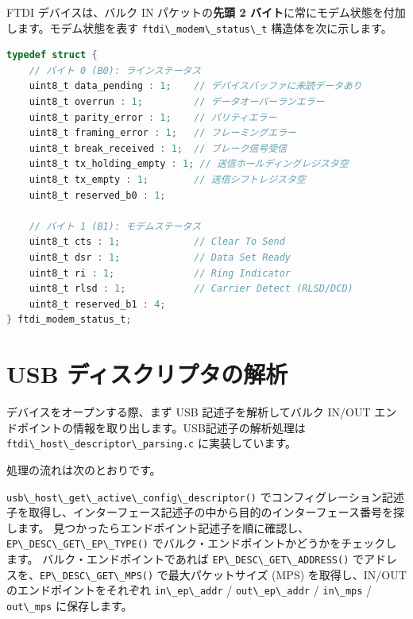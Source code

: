 \documentclass[10pt,twoside,openany,a4j]{ltjsbook}
\newcommand{\passthrough}[1]{#1}
\begin{document}
FTDI デバイスは、バルク IN パケットの\textbf{先頭 2
バイト}に常にモデム状態を付加します。モデム状態を表す
\passthrough{\lstinline!ftdi\_modem\_status\_t!} 構造体を次に示します。

\begin{lstlisting}[language=C]
typedef struct {
    // バイト 0 (B0): ラインステータス
    uint8_t data_pending : 1;    // デバイスバッファに未読データあり
    uint8_t overrun : 1;         // データオーバーランエラー
    uint8_t parity_error : 1;    // パリティエラー
    uint8_t framing_error : 1;   // フレーミングエラー
    uint8_t break_received : 1;  // ブレーク信号受信
    uint8_t tx_holding_empty : 1; // 送信ホールディングレジスタ空
    uint8_t tx_empty : 1;        // 送信シフトレジスタ空
    uint8_t reserved_b0 : 1;

    // バイト 1 (B1): モデムステータス
    uint8_t cts : 1;             // Clear To Send
    uint8_t dsr : 1;             // Data Set Ready
    uint8_t ri : 1;              // Ring Indicator
    uint8_t rlsd : 1;            // Carrier Detect (RLSD/DCD)
    uint8_t reserved_b1 : 4;
} ftdi_modem_status_t;
\end{lstlisting}

\section{USB
ディスクリプタの解析}\label{usb-ux30c7ux30a3ux30b9ux30afux30eaux30d7ux30bfux306eux89e3ux6790}

デバイスをオープンする際、まず USB 記述子を解析してバルク IN/OUT
エンドポイントの情報を取り出します。USB記述子の解析処理は
\passthrough{\lstinline!ftdi\_host\_descriptor\_parsing.c!}
に実装しています。

処理の流れは次のとおりです。

\passthrough{\lstinline!usb\_host\_get\_active\_config\_descriptor()!}
でコンフィグレーション記述子を取得し、インターフェース記述子の中から目的のインターフェース番号を探します。
見つかったらエンドポイント記述子を順に確認し、\passthrough{\lstinline!EP\_DESC\_GET\_EP\_TYPE()!}
でバルク・エンドポイントかどうかをチェックします。
バルク・エンドポイントであれば
\passthrough{\lstinline!EP\_DESC\_GET\_ADDRESS()!}
でアドレスを、\passthrough{\lstinline!EP\_DESC\_GET\_MPS()!}
で最大パケットサイズ (MPS) を取得し、IN/OUTのエンドポイントをそれぞれ
\passthrough{\lstinline!in\_ep\_addr!} /
\passthrough{\lstinline!out\_ep\_addr!} /
\passthrough{\lstinline!in\_mps!} / \passthrough{\lstinline!out\_mps!}
に保存します。
\end{document}
